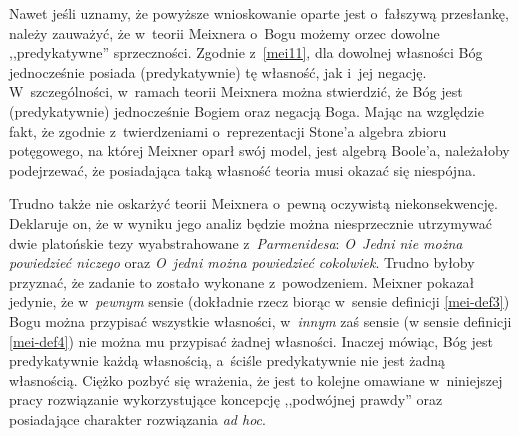 Nawet jeśli uznamy, że powyższe wnioskowanie oparte jest o~fałszywą przesłankę, należy zauważyć, że w~teorii Meixnera o~Bogu możemy orzec dowolne ,,predykatywne'' sprzeczności. Zgodnie z~\eqref{mei11}, dla dowolnej własności Bóg jednocześnie posiada (predykatywnie) tę własność, jak i~jej negację. W~szczególności, w~ramach teorii Meixnera można stwierdzić, że Bóg jest (predykatywnie) jednocześnie Bogiem oraz negacją Boga. Mając na względzie fakt, że zgodnie z~twierdzeniami o~reprezentacji Stone'a algebra zbioru potęgowego, na której Meixner oparł swój model, jest algebrą Boole'a, należałoby podejrzewać, że posiadająca taką własność teoria musi okazać się niespójna.

Trudno także nie oskarżyć teorii Meixnera o~pewną oczywistą niekonsekwencję. Deklaruje on, że w wyniku jego analiz  będzie można niesprzecznie utrzymywać dwie platońskie tezy wyabstrahowane z~\textit{Parmenidesa}: \textit{O~Jedni nie można powiedzieć niczego} oraz \textit{O~jedni można powiedzieć cokolwiek}. Trudno byłoby przyznać, że zadanie to zostało wykonane z~powodzeniem. Meixner pokazał jedynie, że w~\textit{pewnym} sensie (dokładnie rzecz biorąc w~sensie definicji \ref{mei-def3}) Bogu można przypisać wszystkie własności, w~\textit{innym} zaś sensie (w sensie definicji \ref{mei-def4}) nie można mu przypisać żadnej własności. Inaczej mówiąc, Bóg jest predykatywnie każdą własnością, a~ściśle predykatywnie nie jest żadną własnością. Ciężko pozbyć się wrażenia, że jest to kolejne omawiane w~niniejszej pracy rozwiązanie wykorzystujące koncepcję ,,podwójnej prawdy'' oraz posiadające charakter rozwiązania \textit{ad hoc}.

